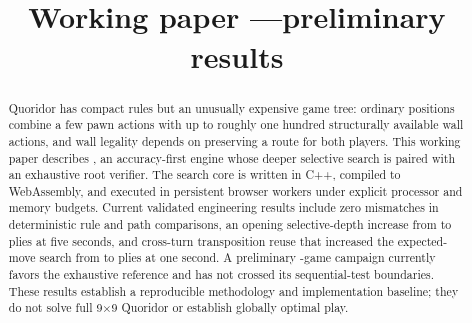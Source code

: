 \documentclass[conference]{IEEEtran}
\title{\papertitle\\\ifworkingdraft\large Working paper \paperversion---preliminary results\fi}
\author{\IEEEauthorblockN{\paperauthor}\IEEEauthorblockA{\paperaffiliation\\\paperemail}}
\begin{document}
\maketitle
\begin{abstract}
Quoridor has compact rules but an unusually expensive game tree: ordinary positions combine a few pawn actions with up to roughly one hundred structurally available wall actions, and wall legality depends on preserving a route for both players. This working paper describes \walwuk, an accuracy-first engine whose deeper selective search is paired with an exhaustive root verifier. The search core is written in C++, compiled to WebAssembly, and executed in persistent browser workers under explicit processor and memory budgets. Current validated engineering results include zero mismatches in \ParityPositions deterministic rule and path comparisons, an opening selective-depth increase from \PhaseOneOldFiveSecondSelectiveDepth{} to \PhaseOneNewFiveSecondSelectiveDepth{} plies at five seconds, and cross-turn transposition reuse that increased the expected-move search from \ColdExpectedMoveDepth{} to \WarmExpectedMoveDepth{} plies at one second. A preliminary \PilotGames-game campaign currently favors the exhaustive reference and has not crossed its sequential-test boundaries. These results establish a reproducible methodology and implementation baseline; they do not solve full 9$\times$9 Quoridor or establish globally optimal play.
\end{abstract}
















\appendices









\end{document}
